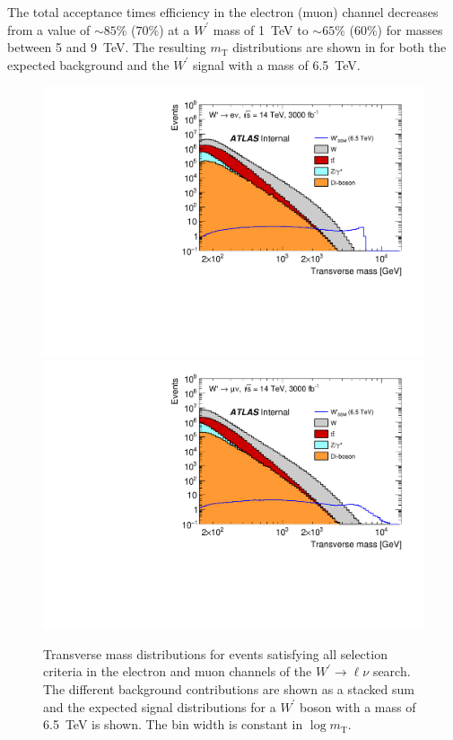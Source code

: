 The total acceptance times efficiency in the electron (muon) channel decreases from
a value of $\sim 85\%$ ($70\%$) at a $W^\prime$ mass of 1~TeV to $\sim 65\%$ ($60\%$) for masses between
5 and 9~TeV.
The resulting $m_\mathrm{T}$ distributions are shown in 
for both the expected background and the $W^\prime$ signal with a mass of 6.5~TeV. 
%
\begin{figure}[htbp]
\centering
\includegraphics[width=0.49\columnwidth]{./section7OtherSignatures/img/MT_Wenu_6500M.pdf}
\includegraphics[width=0.49\columnwidth]{./section7OtherSignatures/img/MT_Wmunu_6500M.pdf}
\caption{
  Transverse mass distributions for events satisfying all selection criteria in the electron and muon
  channels of the $W^\prime\to \ell \nu$ search. The different background contributions are shown
  as a stacked sum and the expected signal distributions for a $W^\prime$ boson with a mass of 6.5~TeV
  is shown. The bin width is constant in $\log m_\mathrm{T}$. 
}
  \label{fig:ATLAS_Wprimelv_mT}
\end{figure}

